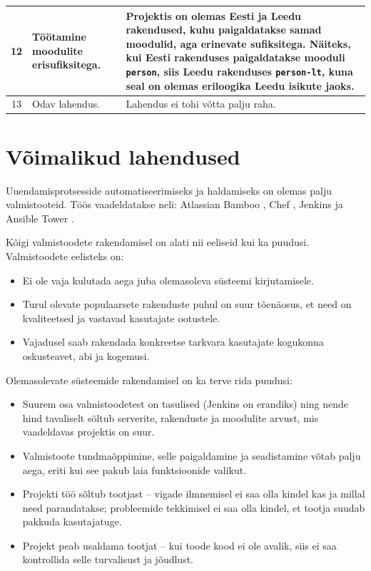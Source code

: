 \documentclass[12pt]{article}
\newcommand{\code}[1]{\texttt{#1}}
\begin{document}
\begin{table}[H]
\begin{tabular}{|c|p{3cm}|p{8cm}|}
      \hline
      12 & Töötamine moodulite erisufiksitega. & Projektis on olemas Eesti ja Leedu rakendused, kuhu paigaldatakse samad moodulid, aga erinevate sufiksitega. Näiteks, kui Eesti rakenduses paigaldatakse mooduli \code{person}, siis Leedu rakenduses \code{person-lt}, kuna seal on olemas eriloogika Leedu isikute jaoks.\\
      \hline
      13 & Odav lahendus. & Lahendus ei tohi võtta palju raha.\\
      \hline
    \end{tabular}
  \end{table}
  
  \newpage
  
  \section{Võimalikud lahendused}
  
  Uuendamisprotsesside automatiseerimiseks ja haldamiseks on olemas palju valmistooteid. Töös vaadeldatakse neli: Atlassian Bamboo \cite{bamboo}, Chef \cite{chef}, Jenkins \cite{jenkins} ja Ansible Tower \cite{ansible}.
  
  Kõigi valmistoodete rakendamisel on alati nii eeliseid kui ka puudusi. Valmistoodete eelisteks on:
  \begin{itemize}
    \item Ei ole vaja kulutada aega juba olemasoleva süsteemi kirjutamisele.
    \item Turul olevate populaarsete rakenduste puhul on suur tõenäosus, et need on kvaliteetsed ja vastavad kasutajate ootustele.
    \item Vajadusel saab rakendada konkreetse tarkvara kasutajate kogukonna oskusteavet, abi ja kogemusi.
  \end{itemize}
  
  Olemasolevate süsteemide rakendamisel on ka terve rida puudusi:
  \begin{itemize}
    \item Suurem osa valmistoodetest on tasulised (Jenkins on erandiks) ning nende hind tavaliselt sõltub serverite, rakenduste ja moodulite arvust, mis vaadeldavas projektis on suur.
    \item Valmistoote tundmaõppimine, selle paigaldamine ja seadistamine võtab palju aega, eriti kui see pakub laia funktsioonide valikut.
    \item Projekti töö sõltub tootjast \--- vigade ilmnemisel ei saa olla kindel kas ja millal need parandatakse; probleemide tekkimisel ei saa olla kindel, et tootja suudab pakkuda kasutajatuge.
    \item Projekt peab usaldama tootjat \--- kui toode kood ei ole avalik, siis ei saa kontrollida selle turvalisust ja jõudlust.
  \end{itemize}
    
\end{document}

